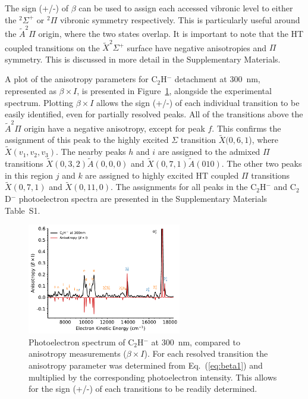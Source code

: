 \documentclass[journal=jpcafh,manuscript=article,layout=onecolumn, 12pt]{achemso}
\begin{document}
The sign (+/-) of $\beta$ can be used to assign each accessed vibronic level to either the $^2\Sigma^+$ or $^2\Pi$ vibronic symmetry respectively. This is particularly useful around the $\tilde{A} ^2\Pi$ origin, where the two states overlap. It is important to note that the HT coupled transitions on the $\tilde{X} ^2\Sigma^+$ surface have negative anisotropies and $\Pi$ symmetry. This is discussed in more detail in the Supplementary Materials.

A plot of the anisotropy parameters for C$_2$H$^-$ detachment at 300~nm, represented as $\beta\times I$, is presented in Figure~\ref{fig:6}, alongside the experimental spectrum. Plotting $\beta\times I$ allows the sign (+/-) of each individual transition to be easily identified, even for partially resolved peaks. All of the transitions above the $\tilde{A} ^2\Pi$ origin have a negative anisotropy, except for peak $f$. This confirms the assignment of this peak to the highly excited $\Sigma$ transition $\tilde{X}(0,6,1$), where $\tilde{X}(v_1,v_2,v_3)$. The nearby peaks $h$ and $i$  are assigned to the admixed $\Pi$ transitions $\tilde{X}(0,3,2)\tilde{A}(0,0,0)$ and $\tilde{X}(0,7,1)\tilde{A}(010)$. The other two peaks in this region $j$ and $k$ are assigned to highly excited HT coupled $\Pi$ transitions $\tilde{X}(0,7,1)$ and $\tilde{X}(0,11,0)$. The assignments for all peaks in the C$_2$H$^-$ and C$_2$D$^-$ photoelectron spectra are presented in the Supplementary Materials Table~S1.

\begin{figure}[th!]
	\includegraphics[width=0.6\textwidth]{figures/plotBeta.pdf}
	\caption{Photoelectron spectrum of C$_2$H$^-$ at 300~nm, compared to anisotropy measurements ($\beta\times I$). For each resolved transition the anisotropy parameter was determined from Eq.~(\ref{eq:beta1}) and multiplied by the corresponding photoelectron intensity. This allows for the sign (+/-) of each transitions to be readily determined.}
	\label{fig:6}
\end{figure}
\end{document}
